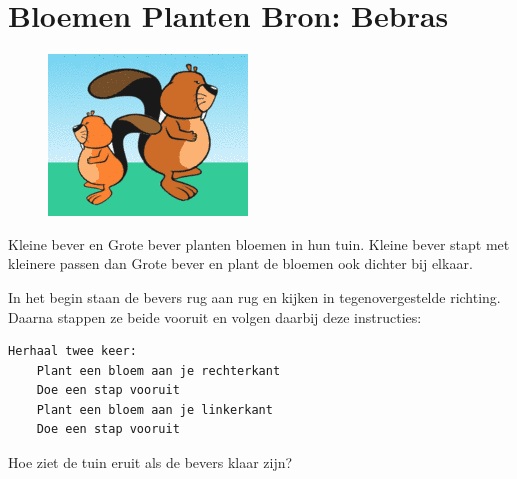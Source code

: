 \documentclass[12pt, a4paper]{article}
\begin{document}
	\begin{minipage}{\textwidth}
		\section{Bloemen Planten \hfill\small Bron: Bebras}
			\begin{figure} 
				\includegraphics[width=\linewidth]{image1}
			\end{figure}
			Kleine bever en Grote bever planten bloemen in hun tuin. Kleine bever stapt met kleinere passen dan Grote bever en plant de bloemen ook dichter bij elkaar.
			
			In het begin staan de bevers rug aan rug en kijken in tegenovergestelde richting. Daarna stappen ze beide vooruit en volgen daarbij deze instructies:
			
\begin{lstlisting}[frame=single]
Herhaal twee keer:
	Plant een bloem aan je rechterkant
	Doe een stap vooruit
	Plant een bloem aan je linkerkant
	Doe een stap vooruit
\end{lstlisting}

			Hoe ziet de tuin eruit als de bevers klaar zijn?
		

\end{minipage}
\end{document}
